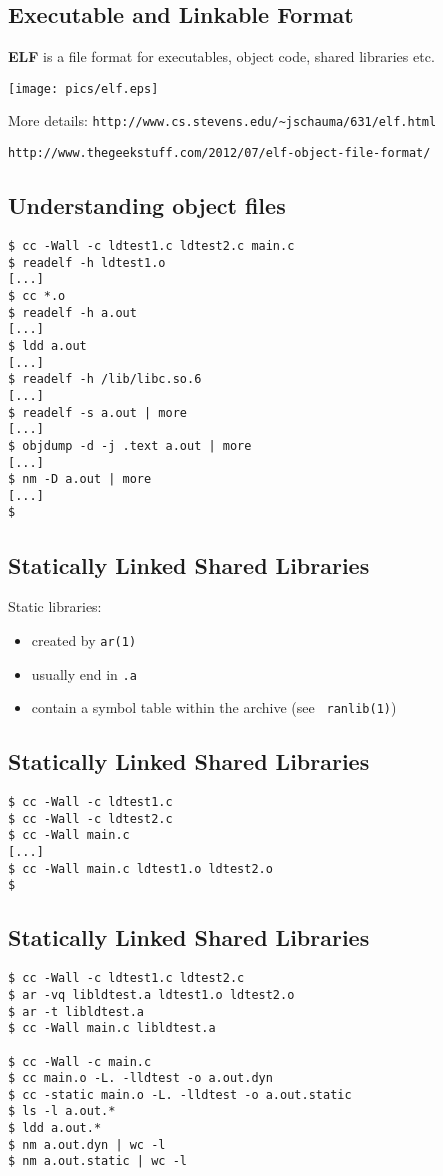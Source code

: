 \documentclass[xga]{xdvislides}
\begin{document}
\subsection{Executable and Linkable Format}

{\bf ELF} is a file format for executables, object code, shared libraries
etc.

\begin{center}
	\texttt{[image: pics/elf.eps]}
\end{center}
More details:
\verb+http://www.cs.stevens.edu/~jschauma/631/elf.html+

\verb+http://www.thegeekstuff.com/2012/07/elf-object-file-format/+
\Normalsize


\subsection{Understanding object files}
\begin{verbatim}
$ cc -Wall -c ldtest1.c ldtest2.c main.c
$ readelf -h ldtest1.o
[...]
$ cc *.o
$ readelf -h a.out
[...]
$ ldd a.out
[...]
$ readelf -h /lib/libc.so.6
[...]
$ readelf -s a.out | more
[...]
$ objdump -d -j .text a.out | more
[...]
$ nm -D a.out | more
[...]
$
\end{verbatim}

\subsection{Statically Linked Shared Libraries}
Static libraries:
\begin{itemize}
	\item created by {\tt ar(1)}
	\item usually end in {\tt .a}
	\item contain a symbol table within the archive (see {\tt
		ranlib(1)})
\end{itemize}

\subsection{Statically Linked Shared Libraries}
\begin{verbatim}
$ cc -Wall -c ldtest1.c
$ cc -Wall -c ldtest2.c
$ cc -Wall main.c
[...]
$ cc -Wall main.c ldtest1.o ldtest2.o
$
\end{verbatim}

\subsection{Statically Linked Shared Libraries}
\begin{verbatim}
$ cc -Wall -c ldtest1.c ldtest2.c
$ ar -vq libldtest.a ldtest1.o ldtest2.o
$ ar -t libldtest.a
$ cc -Wall main.c libldtest.a

$ cc -Wall -c main.c
$ cc main.o -L. -lldtest -o a.out.dyn
$ cc -static main.o -L. -lldtest -o a.out.static
$ ls -l a.out.*
$ ldd a.out.*
$ nm a.out.dyn | wc -l
$ nm a.out.static | wc -l
\end{verbatim}
\end{document}
